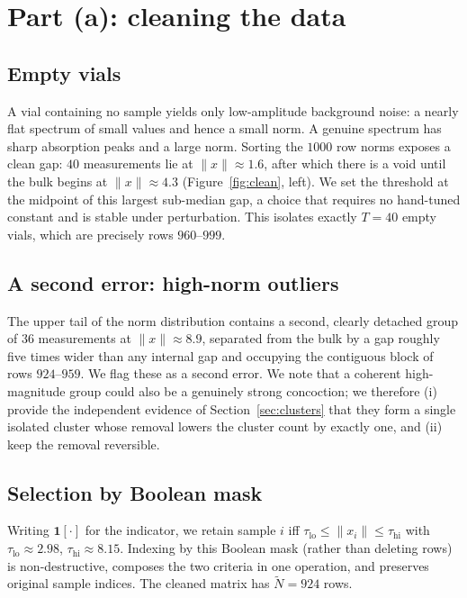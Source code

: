 \documentclass[11pt]{article}
\newcommand{\Nt}{\widetilde{N}}
\newcommand{\norm}[1]{\lVert #1 \rVert}
\theoremstyle{definition}
\theoremstyle{plain}
\theoremstyle{remark}
\begin{document}
\section{Part (a): cleaning the data}\label{sec:clean}

\subsection*{Empty vials}
A vial containing no sample yields only low-amplitude background noise: a nearly flat
spectrum of small values and hence a small norm. A genuine spectrum has sharp absorption
peaks and a large norm. Sorting the $1000$ row norms exposes a clean gap: $40$ measurements
lie at $\norm{x}\approx1.6$, after which there is a void until the bulk begins at
$\norm{x}\approx4.3$ (Figure~\ref{fig:clean}, left). We set the threshold at the midpoint of
this largest sub-median gap, a choice that requires no hand-tuned constant and is stable
under perturbation. This isolates exactly $T=40$ empty vials, which are precisely rows
$960$--$999$.

\subsection*{A second error: high-norm outliers}
The upper tail of the norm distribution contains a second, clearly detached group of $36$
measurements at $\norm{x}\approx8.9$, separated from the bulk by a gap roughly five times
wider than any internal gap and occupying the contiguous block of rows $924$--$959$. We flag
these as a second error. We note that a coherent high-magnitude group could also be a
genuinely strong concoction; we therefore (i) provide the independent evidence of
Section~\ref{sec:clusters} that they form a single isolated cluster whose removal lowers the
cluster count by exactly one, and (ii) keep the removal reversible.

\subsection*{Selection by Boolean mask}
Writing $\mathbf{1}[\cdot]$ for the indicator, we retain sample $i$ iff
$\tau_{\mathrm{lo}}\le\norm{x_i}\le\tau_{\mathrm{hi}}$ with
$\tau_{\mathrm{lo}}\approx2.98$, $\tau_{\mathrm{hi}}\approx8.15$. Indexing by this Boolean
mask (rather than deleting rows) is non-destructive, composes the two criteria in one
operation, and preserves original sample indices. The cleaned matrix has $\Nt=924$ rows.
\end{document}
